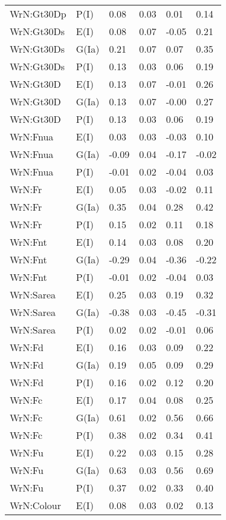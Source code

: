 \begin{center}
\begin{longtable}{|p{1.1in}|p{0.7in}|p{0.7in}|p{0.6in}|p{0.6in}|p{0.6in}|}
  WrN:Gt30Dp & P(I) & 0.08 & 0.03 & 0.01 & 0.14 \\ 
  WrN:Gt30Ds & E(I) & 0.08 & 0.07 & -0.05 & 0.21 \\ 
  WrN:Gt30Ds & G(Ia) & 0.21 & 0.07 & 0.07 & 0.35 \\ 
  WrN:Gt30Ds & P(I) & 0.13 & 0.03 & 0.06 & 0.19 \\ 
  WrN:Gt30D & E(I) & 0.13 & 0.07 & -0.01 & 0.26 \\ 
  WrN:Gt30D & G(Ia) & 0.13 & 0.07 & -0.00 & 0.27 \\ 
  WrN:Gt30D & P(I) & 0.13 & 0.03 & 0.06 & 0.19 \\ 
  WrN:Fnua & E(I) & 0.03 & 0.03 & -0.03 & 0.10 \\ 
  WrN:Fnua & G(Ia) & -0.09 & 0.04 & -0.17 & -0.02 \\ 
  WrN:Fnua & P(I) & -0.01 & 0.02 & -0.04 & 0.03 \\ 
  WrN:Fr & E(I) & 0.05 & 0.03 & -0.02 & 0.11 \\ 
  WrN:Fr & G(Ia) & 0.35 & 0.04 & 0.28 & 0.42 \\ 
  WrN:Fr & P(I) & 0.15 & 0.02 & 0.11 & 0.18 \\ 
  WrN:Fnt & E(I) & 0.14 & 0.03 & 0.08 & 0.20 \\ 
  WrN:Fnt & G(Ia) & -0.29 & 0.04 & -0.36 & -0.22 \\ 
  WrN:Fnt & P(I) & -0.01 & 0.02 & -0.04 & 0.03 \\ 
  WrN:Sarea & E(I) & 0.25 & 0.03 & 0.19 & 0.32 \\ 
  WrN:Sarea & G(Ia) & -0.38 & 0.03 & -0.45 & -0.31 \\ 
  WrN:Sarea & P(I) & 0.02 & 0.02 & -0.01 & 0.06 \\ 
  WrN:Fd & E(I) & 0.16 & 0.03 & 0.09 & 0.22 \\ 
  WrN:Fd & G(Ia) & 0.19 & 0.05 & 0.09 & 0.29 \\ 
  WrN:Fd & P(I) & 0.16 & 0.02 & 0.12 & 0.20 \\ 
  WrN:Fc & E(I) & 0.17 & 0.04 & 0.08 & 0.25 \\ 
  WrN:Fc & G(Ia) & 0.61 & 0.02 & 0.56 & 0.66 \\ 
  WrN:Fc & P(I) & 0.38 & 0.02 & 0.34 & 0.41 \\ 
  WrN:Fu & E(I) & 0.22 & 0.03 & 0.15 & 0.28 \\ 
  WrN:Fu & G(Ia) & 0.63 & 0.03 & 0.56 & 0.69 \\ 
  WrN:Fu & P(I) & 0.37 & 0.02 & 0.33 & 0.40 \\ 
  WrN:Colour & E(I) & 0.08 & 0.03 & 0.02 & 0.13 \\ 

\end{longtable}
\end{center}
